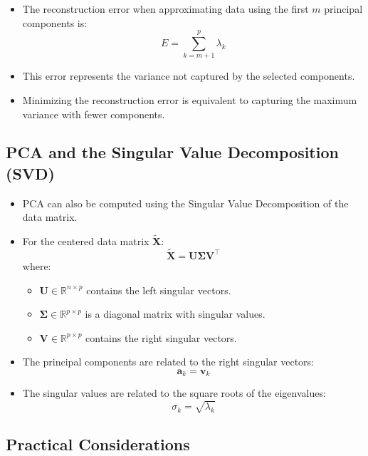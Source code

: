 \documentclass{article}
\begin{document}
\begin{itemize}
    \item The reconstruction error when approximating data using the first $m$ principal components is:
    \[
    E = \sum_{k=m+1}^p \lambda_k
    \]
    \item This error represents the variance not captured by the selected components.
    \item Minimizing the reconstruction error is equivalent to capturing the maximum variance with fewer components.
\end{itemize}

\subsection{PCA and the Singular Value Decomposition (SVD)}

\begin{itemize}
    \item PCA can also be computed using the Singular Value Decomposition of the data matrix.
    \item For the centered data matrix $\tilde{\mathbf{X}}$:
    \[
    \tilde{\mathbf{X}} = \mathbf{U} \mathbf{\Sigma} \mathbf{V}^\top
    \]
    where:
    \begin{itemize}
        \item $\mathbf{U} \in \mathbb{R}^{n \times p}$ contains the left singular vectors.
        \item $\mathbf{\Sigma} \in \mathbb{R}^{p \times p}$ is a diagonal matrix with singular values.
        \item $\mathbf{V} \in \mathbb{R}^{p \times p}$ contains the right singular vectors.
    \end{itemize}
    \item The principal components are related to the right singular vectors:
    \[
    \mathbf{a}_k = \mathbf{v}_k
    \]
    \item The singular values are related to the square roots of the eigenvalues:
    \[
    \sigma_k = \sqrt{\lambda_k}
    \]
\end{itemize}

\subsection{Practical Considerations}
\end{document}
